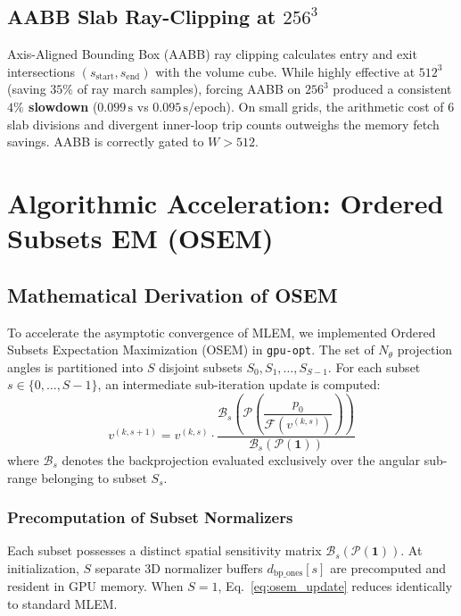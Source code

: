 \documentclass[11pt,a4paper]{article}
\begin{document}
\subsection{AABB Slab Ray-Clipping at $256^3$}
Axis-Aligned Bounding Box (AABB) ray clipping calculates entry and exit intersections $(s_{\text{start}}, s_{\text{end}})$ with the volume cube. While highly effective at $512^3$ (saving $35\%$ of ray march samples), forcing AABB on $256^3$ produced a consistent \textbf{$4\%$ slowdown} ($0.099\,\text{s}$ vs $0.095\,\text{s}$/epoch). On small grids, the arithmetic cost of 6 slab divisions and divergent inner-loop trip counts outweighs the memory fetch savings. AABB is correctly gated to $W > 512$.

\section{Algorithmic Acceleration: Ordered Subsets EM (OSEM)}
\label{sec:osem}

\subsection{Mathematical Derivation of OSEM}
To accelerate the asymptotic convergence of MLEM, we implemented Ordered Subsets Expectation Maximization (OSEM) in \texttt{gpu-opt}. The set of $N_\theta$ projection angles is partitioned into $S$ disjoint subsets $S_0, S_1, \dots, S_{S-1}$. For each subset $s \in \{0, \dots, S-1\}$, an intermediate sub-iteration update is computed:
\begin{equation}
    v^{(k, s+1)} = v^{(k, s)} \cdot \frac{\mathcal{B}_s\left(\mathcal{P}\left(\dfrac{p_0}{\mathcal{F}(v^{(k, s)})}\right)\right)}{\mathcal{B}_s\left(\mathcal{P}(\mathbf{1})\right)}
    \label{eq:osem_update}
\end{equation}
where $\mathcal{B}_s$ denotes the backprojection evaluated exclusively over the angular sub-range belonging to subset $S_s$.

\subsubsection{Precomputation of Subset Normalizers}
Each subset possesses a distinct spatial sensitivity matrix $\mathcal{B}_s(\mathcal{P}(\mathbf{1}))$. At initialization, $S$ separate 3D normalizer buffers $d_{\text{bp\_ones}}[s]$ are precomputed and resident in GPU memory. When $S=1$, Eq.~\eqref{eq:osem_update} reduces identically to standard MLEM.
\end{document}
